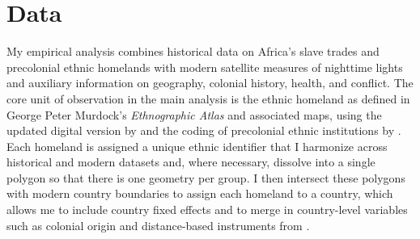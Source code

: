\documentclass[12pt]{article}
\begin{document}
\section{Data}
\label{sec:data}

My empirical analysis combines historical data on Africa's slave trades and precolonial ethnic homelands with modern satellite measures of nighttime lights and auxiliary information on geography, colonial history, health, and conflict. The core unit of observation in the main analysis is the ethnic homeland as defined in George Peter Murdock's \emph{Ethnographic Atlas} and associated maps, using the updated digital version by \citet{gray1999} and the coding of precolonial ethnic institutions by \citet{michalopoulospapaioannou2013}. Each homeland is assigned a unique ethnic identifier that I harmonize across historical and modern datasets and, where necessary, dissolve into a single polygon so that there is one geometry per group. I then intersect these polygons with modern country boundaries to assign each homeland to a country, which allows me to include country fixed effects and to merge in country-level variables such as colonial origin and distance-based instruments from \citet{nunn2008}.
\end{document}
